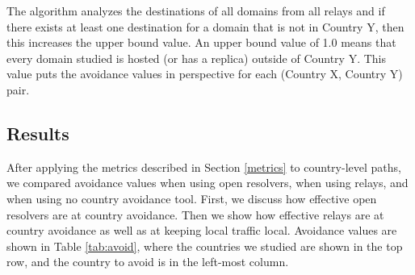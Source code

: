 The algorithm analyzes the destinations of all domains from all relays and if there exists at least one destination for a domain that is not in Country Y, then this increases the upper bound value.  An upper bound value of 1.0 means that every domain studied is hosted (or has a replica) outside of Country Y.  This value puts the avoidance values in perspective for each (Country X, Country Y) pair. 

\subsection{Results}
After applying the metrics described in Section \ref{metrics} to country-level paths, we compared avoidance values when using open resolvers, when using relays, and when using no country avoidance tool.  First, we discuss how effective open resolvers are at country avoidance.  Then we show how effective relays are at country avoidance as well as at keeping local traffic local.  Avoidance values are shown in Table \ref{tab:avoid}, where the countries we studied are shown in the top row, and the country to avoid is in the left-most column.  

